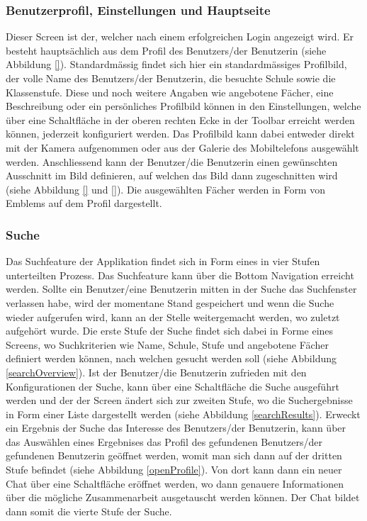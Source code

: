 \documentclass[../main.tex]{subfiles}
\begin{document}
\subsubsection*{Benutzerprofil, Einstellungen und Hauptseite} 
Dieser Screen ist der, welcher nach einem erfolgreichen Login angezeigt wird. Er besteht hauptsächlich aus dem Profil des Benutzers/der Benutzerin (siehe Abbildung \ref{}). Standardmässig findet sich hier ein standardmässiges Profilbild, der volle Name des Benutzers/der Benutzerin, die besuchte Schule sowie die Klassenstufe. Diese und noch weitere Angaben wie angebotene Fächer, eine Beschreibung oder ein persönliches Profilbild können in den Einstellungen, welche über eine Schaltfläche in der oberen rechten Ecke in der Toolbar erreicht werden können, jederzeit konfiguriert werden. Das Profilbild kann dabei entweder direkt mit der Kamera aufgenommen oder aus der Galerie des Mobiltelefons ausgewählt werden. Anschliessend kann der Benutzer/die Benutzerin einen gewünschten Ausschnitt im Bild definieren, auf welchen das Bild dann zugeschnitten wird (siehe Abbildung \ref{} und \ref{}). Die ausgewählten Fächer werden in Form von Emblems auf dem Profil dargestellt.

\subsubsection*{Suche}
Das Suchfeature der Applikation findet sich in Form eines in vier Stufen unterteilten Prozess. Das Suchfeature kann über die Bottom Navigation erreicht werden. Sollte ein Benutzer/eine Benutzerin mitten in der Suche das Suchfenster verlassen habe, wird der momentane Stand gespeichert und wenn die Suche wieder aufgerufen wird, kann an der Stelle weitergemacht werden, wo zuletzt aufgehört wurde. Die erste Stufe der Suche findet sich dabei in Forme eines Screens, wo Suchkriterien wie Name, Schule, Stufe und angebotene Fächer definiert werden können, nach welchen gesucht werden soll (siehe Abbildung \ref{searchOverview}). Ist der Benutzer/die Benutzerin zufrieden mit den Konfigurationen der Suche, kann über eine Schaltfläche die Suche ausgeführt werden und der der Screen ändert sich zur zweiten Stufe, wo die Suchergebnisse in Form einer Liste dargestellt werden (siehe Abbildung \ref{searchResults}). Erweckt ein Ergebnis der Suche das Interesse des Benutzers/der Benutzerin, kann über das Auswählen eines Ergebnises das Profil des gefundenen Benutzers/der gefundenen Benutzerin geöffnet werden, womit man sich dann auf der dritten Stufe befindet (siehe Abbildung  \ref{openProfile}). Von dort kann dann ein neuer Chat über eine Schaltfläche eröffnet werden, wo dann genauere Informationen über die mögliche Zusammenarbeit ausgetauscht werden können. Der Chat bildet dann somit die vierte Stufe der Suche.
\end{document}
